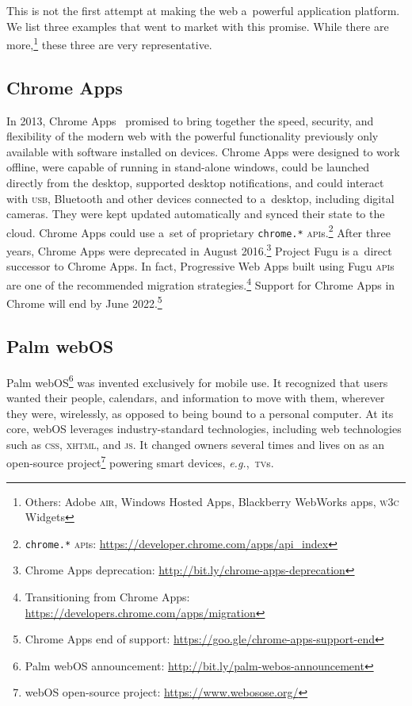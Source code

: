 \documentclass[sigconf]{acmart}
\begin{document}
This is not the first attempt at making the web a~powerful application platform.
We list three examples that went to market with this promise.
While there are more,\footnote{Others: Adobe \textsc{air}, Windows Hosted Apps,
Blackberry WebWorks apps, \textsc{w3c} Widgets} these three are very representative.

\subsection{Chrome Apps}

In 2013, Chrome Apps~\cite{kay13} promised to bring together the speed, security,
and flexibility of the modern web with the powerful functionality
previously only available with software installed on devices. 
Chrome Apps were designed to work offline, were capable of running in stand-alone windows,
could be launched directly from the desktop,
supported desktop notifications,
and could interact with \textsc{usb}, Bluetooth and other devices connected to a~desktop,
including digital cameras.
They were kept updated automatically and synced their state to the cloud.
Chrome Apps could use a~set of proprietary \texttt{chrome.*}
\textsc{api}s.\footnote{\texttt{chrome.*}
\textsc{api}s: \url{https://developer.chrome.com/apps/api_index}}
After three years, Chrome Apps were deprecated in August
2016.\footnote{Chrome Apps deprecation:
\url{http://bit.ly/chrome-apps-deprecation}}
Project Fugu is a~direct successor to Chrome Apps.
In fact, Progressive Web Apps built using Fugu \textsc{api}s
are one of the recommended migration
strategies.\footnote{Transitioning from Chrome Apps: \url{https://developers.chrome.com/apps/migration}}
Support for Chrome Apps in Chrome will end by June 2022.\footnote{Chrome Apps end of support:
\url{https://goo.gle/chrome-apps-support-end}}

\subsection{Palm web\textsc{OS}}

Palm web\textsc{OS}\footnote{Palm web\textsc{OS} announcement:
\url{http://bit.ly/palm-webos-announcement}}
was invented exclusively for mobile use.
It recognized that users wanted their people, calendars, and information to move with them,
wherever they were, wirelessly, as opposed to being bound to a personal computer.
At its core, web\textsc{OS} leverages industry-standard technologies,
including web technologies such as \textsc{css}, \textsc{xhtml}, and \textsc{js}.
It changed owners several times and lives on as an open-source
project\footnote{web\textsc{OS} open-source project: \url{https://www.webosose.org/}}
powering smart devices, \textit{e.g.},\ \textsc{tv}s.
\end{document}
